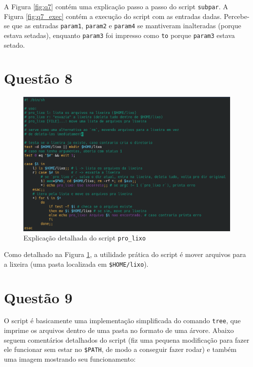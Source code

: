 \documentclass{article}
\begin{document}
A Figura \ref*{fig:q7} contém uma explicação passo a passo do script \texttt{subpar}. A Figura \ref*{fig:q7_exec} contém a execução do script com as entradas dadas. Percebe-se que as entradas \texttt{param1}, \texttt{param2} e \texttt{param4} se mantiveram inalteradas (porque estava setadas), enquanto \texttt{param3} foi impresso como \texttt{to} porque \texttt{param3} estava setado.

\newpage
\section*{Questão 8}

\begin{figure}[!ht]
    \begin{center}
        \includegraphics[width=\textwidth]{images/q8.png}
        \caption{Explicação detalhada do script \texttt{pro\_lixo}}
        \label{fig:q8}
    \end{center}
\end{figure}

Como detalhado na Figura \ref*{fig:q8}, a utilidade prática do script é mover arquivos para a lixeira (uma pasta localizada em \texttt{\$HOME/lixo}).

\newpage
\section*{Questão 9}

O script é basicamente uma implementação simplificada do comando \texttt{tree}, que imprime os arquivos dentro de uma pasta no formato de uma árvore. Abaixo seguem comentários detalhados do script (fiz uma pequena modificação para fazer ele funcionar sem estar no \texttt{\$PATH}, de modo a conseguir fazer rodar) e também uma imagem mostrando seu funcionamento:
\end{document}

